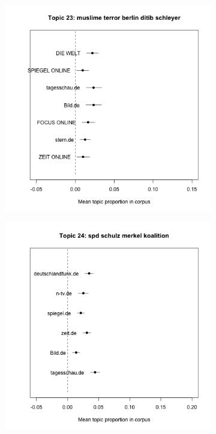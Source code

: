 \documentclass[12pt,a4paper,notitlepage]{article}
\begin{document}
\begin{figure}[H]
\begin{center}
\begin{subfigure}[normla]{0.2\textwidth}
		\end{subfigure}
		\begin{subfigure}[normla]{0.2\textwidth}
			\includegraphics[width=\textwidth]{../figs/estimate_effect23.png}
		\end{subfigure}
		\begin{subfigure}[normla]{0.2\textwidth}
			\includegraphics[width=\textwidth]{../figs/estimate_effect24.png}

\end{subfigure}
\end{center}
\end{figure}
\end{document}
